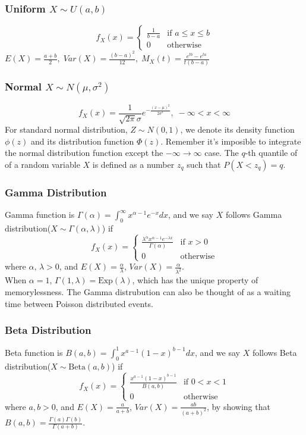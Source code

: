 \documentclass[a4paper,12pt]{article}
\begin{document}
\begin{multicols}{2}
\subsubsection*{Uniform $X\sim U(a,b)$}
\[
f_X(x) = \begin{cases}
\frac{1}{b-a} & \text{if } a\leq x\leq b \\
0 & \text{otherwise}
\end{cases}
\]
$E(X) = \frac{a+b}{2}, \; Var(X) = \frac{(b-a)^2}{12}, \; M_X(t) = \frac{e^{tb}-e^{ta}}{t(b-a)}$

\subsubsection*{Normal $X\sim N(\mu,\sigma^2)$}
\[
f_X(x) = \frac{1}{\sqrt{2\pi}\sigma}e^{-\frac{(x-\mu)^2}{2\sigma^2}}, \; -\infty < x < \infty
\]
For standard normal distribution, $Z\sim N(0,1)$, we denote its density function $\phi(z)$ and its distribution function $\Phi(z)$. 
Remember it's imposible to integrate the normal distribution function except the $-\infty \to \infty$ case.
The $q$-th quantile of of a random variable $X$ is defined as a number $z_q$ such that $P(X<z_q)=q$.

\subsubsection*{Gamma Distribution}
Gamma function is $\Gamma(\alpha)=\int_{0}^{\infty}x^{\alpha-1}e^{-x}dx$, and we say $X$ follows Gamma distribution($X\sim \Gamma(\alpha, \lambda)$) if 
\[
f_X(x) = \begin{cases}
\frac{\lambda^{\alpha}x^{\alpha-1}e^{-\lambda x}}{\Gamma(\alpha)} & \text{if } x>0 \\
0 & \text{otherwise}
\end{cases}
\]
where $\alpha,\,\lambda>0$, and $E(X) = \frac{\alpha}{\lambda}$, $Var(X) = \frac{\alpha}{\lambda^2}$.\\
\indent When $\alpha=1$, $\Gamma(1,\lambda)=\text{Exp}(\lambda)$, which has the unique property of memorylessness. 
The Gamma distrubution can also be thought of as a waiting time between Poisson distributed events.

\subsubsection*{Beta Distribution}
Beta function is $B(a,b)=\int_0^1x^{a-1}(1-x)^{b-1}dx$, and we say $X$ follows Beta distribution($X\sim \text{Beta}(a,b)$) if
\[
f_X(x) = \begin{cases}
\frac{x^{a-1}(1-x)^{b-1}}{B(a,b)} & \text{if } 0<x<1 \\
0 & \text{otherwise}
\end{cases}
\]
where $a,b>0$, and $E(X) = \frac{a}{a+b}$, $Var(X) = \frac{ab}{(a+b)^2}$, by showing that $B(a,b)=\frac{\Gamma(a)\Gamma(b)}{\Gamma(a+b)}$.


\end{multicols}
\end{document}
